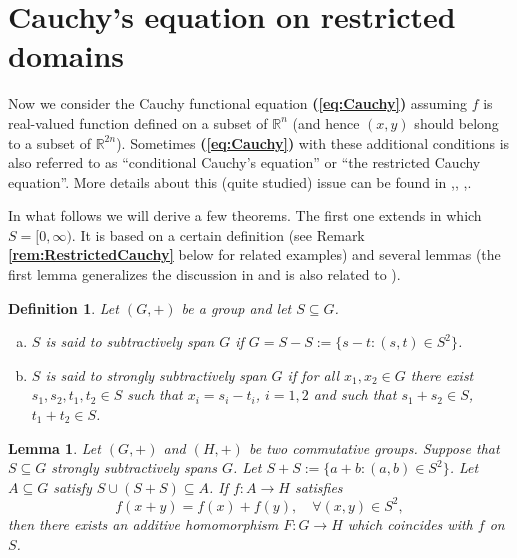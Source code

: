 \documentclass[12 pt]{amsart}
\newtheorem{lem}[thm]{Lemma}
\newtheorem{defin}[thm]{Definition}
\theoremstyle{definition}
\newcommand{\R}{\mathbb{R}}
\newcommand{\bref}[1]{\textbf{\ref{#1}}} %
\newcommand{\beqref}[1]{\textbf{(\ref{#1})}} %
\begin{document}
\section{Cauchy's equation on restricted domains}\label{sec:Restricted}
Now we consider the Cauchy functional equation \beqref{eq:Cauchy} assuming $f$ is real-valued function defined on a subset 
of $\R^n$ (and hence $(x,y)$ should belong to a subset of $\R^{2n}$). 
Sometimes \beqref{eq:Cauchy} with these additional conditions is also 
referred to as ``conditional Cauchy's equation'' or ``the restricted Cauchy equation''. 
 More details about this (quite studied) issue can be found 
 in \cite[pp. 44--49]{Aczel},\cite[pp. 12, 18, 73, 84--92]{AczelDhombres}, 
 \cite{Dhombres1979},\cite[pp. 369--374]{Kuczma2009book}. 
 
In what follows we will derive a few theorems. The first one extends \cite[Corollary 9, p. 18]{AczelDhombres} in which $S=[0,\infty)$. It is based on a certain definition (see Remark \bref{rem:RestrictedCauchy} below for related examples) and several lemmas  
 (the first lemma generalizes the discussion in \cite[p. 12]{AczelDhombres} and is also related 
 to \cite{ABDKR1971}). 
  
\begin{defin}\label{def:StronglySpan}
Let $(G,+)$ be a group and let $S\subseteq G$. 
\begin{enumerate}[(a)]
\item $S$ is said to subtractively span $G$ 
if $G=S-S:=\{s-t: (s,t)\in S^2\}$. 
\item $S$ is said to strongly subtractively span $G$ if for 
all $x_1,x_2\in G$ there exist $s_1,s_2,t_1,t_2\in S$ 
such that $x_i=s_i-t_i$, $i=1,2$ and such that $s_1+s_2\in S$, $t_1+t_2\in S$.
\end{enumerate}
\end{defin}

\begin{lem}\label{lem:ExtensionHomomorphism}
Let $(G,+)$ and $(H,+)$ be two commutative groups. Suppose that 
$S\subseteq G$ strongly subtractively spans $G$. Let $S+S:=\{a+b: (a,b)\in S^2\}$. 
Let $A\subseteq G$ satisfy $S\cup(S+S)\subseteq A$. 
If $f:A\to H$ satisfies 
\begin{equation}\label{eq:CauchyRestricted}
f(x+y)=f(x)+f(y),\quad \forall (x,y)\in S^2,
\end{equation}
then there exists an additive homomorphism $F:G\to H$ which coincides with $f$ on $S$. 
\end{lem}
\end{document}
